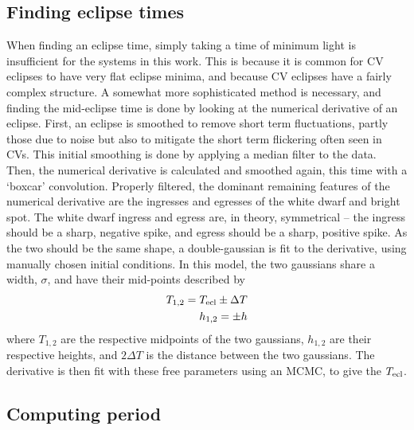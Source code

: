 \subsection{Finding eclipse times}
\label{sect:modelling:finding eclipse times}

When finding an eclipse time, simply taking a time of minimum light is insufficient for the systems in this work. This is because it is common for CV eclipses to have very flat eclipse minima, and because CV eclipses have a fairly complex structure. 
A somewhat more sophisticated method is necessary, and finding the mid-eclipse time is done by looking at the numerical derivative of an eclipse. 
First, an eclipse is smoothed to remove short term fluctuations, partly those due to noise but also to mitigate the short term flickering often seen in CVs. This initial smoothing is done by applying a median filter to the data. Then, the numerical derivative is calculated and smoothed again, this time with a `boxcar' convolution. Properly filtered, the dominant remaining features of the numerical derivative are the ingresses and egresses of the white dwarf and bright spot. 
The white dwarf ingress and egress are, in theory, symmetrical -- the ingress should be a sharp, negative spike, and egress should be a sharp, positive spike. As the two should be the same shape, a double-gaussian is fit to the derivative, using manually chosen initial conditions. In this model, the two gaussians share a width, $\sigma$, and have their mid-points described by
\begin{align*}
    T_{\rm 1,2} = T_{\rm ecl} \pm \Delta T \\
    h_{\rm 1,2} = \pm h
\end{align*}
where $T_{1,2}$ are the respective midpoints of the two gaussians, $h_{1,2}$ are their respective heights, and $2\Delta T$ is the distance between the two gaussians. 
The derivative is then fit with these free parameters using an MCMC, to give the $T_{\rm ecl}$.

\subsection{Computing period}
\label{sect:modelling:Computing ephemeris}

